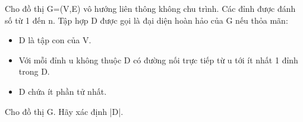 Cho đồ thị G=(V,E) vô hướng liên thông không chu trình. Các đỉnh được đánh số từ 1 đến n. Tập hợp D được gọi là đại diện hoàn hảo của G nếu thỏa mãn:  
\begin{itemize}
	\item     D là tập con của V.   
	\item     Với mỗi đỉnh u không thuộc D có đường nối trực tiếp từ u tới ít nhất 1 đỉnh trong D.   
	\item     D chứa ít phần tử nhất.   
\end{itemize}

   Cho đồ thị G. Hãy xác định |D|.  

\